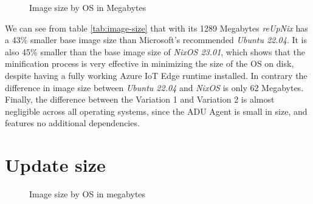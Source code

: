 \begin{figure}[H]
\centering
{}
\caption{Image size by OS in Megabytes}
\label{fig:image-size}
\end{figure}

\noindent
We can see from table \ref{tab:image-size} that with its 1289 Megabytes
\textit{reUpNix} has a 43\% smaller base image size than Microsoft's recommended
\textit{Ubuntu 22.04}. It is also 45\% smaller than the base image size of
\textit{NixOS 23.01}, which shows that the minification process is very effective
in minimizing the size of the \ac{OS} on disk, despite having a fully working
Azure IoT Edge runtime installed.
In contrary the difference in image size between \textit{Ubuntu 22.04} and
\textit{NixOS} is only 62 Megabytes.
Finally, the difference between the Variation 1 and Variation 2 is almost
negligible across all operating systems, since the \ac{ADU} Agent is small in
size, and features no additional dependencies.

\section{Update size}
\begin{figure}[H]
\centering
{}
\caption{Image size by OS in megabytes}
\end{figure}
\clearpage
